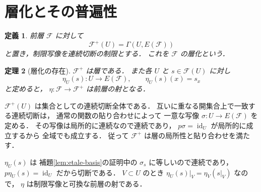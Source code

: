 \documentclass[a5paper,10pt,onecolumn]{jsarticle}
\makeatletter
\theoremstyle{mathnotetheorem}
\newtheorem{theorem}{定理}[section]
\newtheorem{definition}[theorem]{定義}
\renewcommand{\proofname}{証明}
\renewenvironment{proof}[1][\proofname]{%
  \par\pushQED{\qed}\normalfont\topsep4\p@\@plus2\p@\relax
  \trivlist\item[\hskip\labelsep\bfseries #1]\ignorespaces
}{\popQED\endtrivlist\@endpefalse}
\makeatother
\begin{document}
\section{層化とその普遍性}

\begin{definition}
前層 $\mathcal F$ に対して
\[
 \mathcal F^+(U)=\Gamma(U,E(\mathcal F))
\]
と置き，制限写像を連続切断の制限とする．
これを $\mathcal F$ の\emph{層化}という．
\end{definition}

\begin{theorem}[層化の存在]\label{thm:sheafification}
$\mathcal F^+$ は層である．
また各 $U$ と $s\in\mathcal F(U)$ に対し
\[
 \eta_U(s):U\to E(\mathcal F),\qquad
 \eta_U(s)(x)=s_x
\]
と定めると，
$\eta:\mathcal F\to\mathcal F^+$ は前層の射となる．
\end{theorem}
\begin{proof}
$\mathcal F^+(U)$ は集合としての連続切断全体である．
互いに重なる開集合上で一致する連続切断は，
通常の関数の貼り合わせによって
一意な写像 $\sigma:U\to E(\mathcal F)$ を定める．
その写像は局所的に連続なので連続であり，
$p\sigma=\operatorname{id}_U$ が局所的に成立するから
全域でも成立する．
従って $\mathcal F^+$ は層の局所性と貼り合わせを満たす．

$\eta_U(s)$ は
補題\ref{lem:etale-basis}の証明中の
$\sigma_s$ に等しいので連続であり，
$p\eta_U(s)=\operatorname{id}_U$ だから切断である．
$V\subset U$ のとき
$\eta_U(s)|_V=\eta_V(s|_V)$ なので，
$\eta$ は制限写像と可換な前層の射である．
\end{proof}
\end{document}
